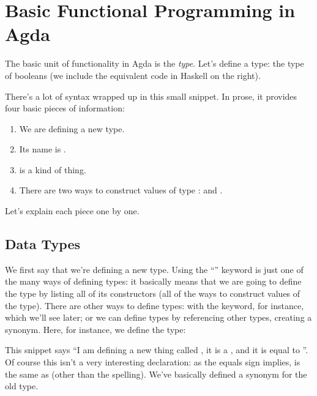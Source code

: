 \section{Basic Functional Programming in Agda}
The basic unit of functionality in Agda is the \emph{type}.
Let's define a type: the type of booleans (we include the equivalent code in
Haskell on the right).
\begin{agdalisting} \label{bool-def}
  \begin{multicols}{2} \centering
     \columnbreak
  \end{multicols}\vspace{-2\baselineskip}
\end{agdalisting}
There's a lot of syntax wrapped up in this small snippet.
In prose, it provides four basic pieces of information:
\begin{samepage}
\begin{enumerate}
  \item We are defining a new  type.
  \item Its name is .
  \item {} is a  kind of thing.
  \item There are two ways to construct values of type :
     and .
\end{enumerate}
\end{samepage}
Let's explain each piece one by one.

\subsection{Data Types}
We first say that we're defining a new  type.
Using the ``'' keyword is just one of the many ways of
defining types: it basically means that we are going to define the type by
listing all of its constructors (all of the ways to construct values of the
type).
There are other ways to define types: with the  keyword, for
instance, which we'll see later; or we can define types by referencing other
types, creating a synonym.
Here, for instance, we define the  type:
\begin{agdalisting*}
\end{agdalisting*}
This snippet says ``I am defining a new thing called , it
is a , and it is equal to ''.
Of course this isn't a very interesting declaration: as the equals sign implies,
 is the same as  (other than the
spelling).
We've basically defined a synonym for the old type.

